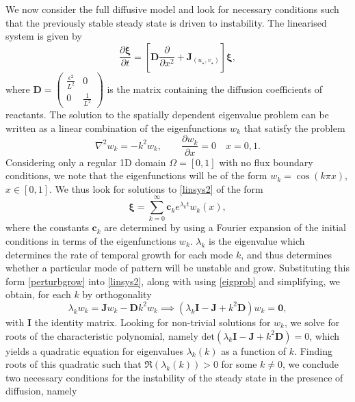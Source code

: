 We now consider the full diffusive model and look for necessary conditions such that the previously stable steady state is driven to instability. The linearised system is given by
\begin{equation}\label{linsys2}
    \frac{\partial \pmb{\xi}}{\partial t}=\left[\textbf{D}\frac{\partial}{\partial x^2}+\textbf{J}_{(u_\star,v_\star)} \right]\pmb{\xi},
\end{equation}
where $\textbf{D}=\begin{pmatrix}\frac{\epsilon^2}{L^2}&0\\0&\frac{1}{L^2}\end{pmatrix}$ is the matrix containing the diffusion coefficients of reactants. The solution to the spatially dependent eigenvalue problem can be written as a linear combination of the eigenfunctions $w_k$ that satisfy the problem
\begin{equation}\label{eigprob}
\nabla^2w_k=-k^2w_k,\quad \quad \frac{\partial w_k}{\partial x}=0\quad x=0, 1.
\end{equation}
Considering only a regular 1D domain $\Omega=[0,1]$ with no flux boundary conditions, we note that the eigenfunctions will be of the form $w_k=\cos(k\pi x)$, $x\in[0,1]$. We thus look for solutions to \eqref{linsys2} of the form
\begin{equation}\label{perturbgrow}
    \pmb{\xi}=\sum_{k=0}^{\infty} \textbf{c}_ke^{\lambda_k t}w_k(x),
\end{equation}
where the constants $\textbf{c}_k$ are determined by using a Fourier expansion of the initial conditions in terms of the eigenfunctions $w_k$. $\lambda_k$ is the eigenvalue which determines the rate of temporal growth for each mode $k$, and thus determines whether a particular mode of pattern will be unstable and grow. Substituting this form \eqref{perturbgrow} into \eqref{linsys2}, along with using \eqref{eigprob} and simplifying, we obtain, for each $k$ by orthogonality
$$
\lambda_k w_k=\textbf{J}w_k-\textbf{D}k^2w_k \implies (\lambda_k \textbf{I}-\textbf{J}+k^2\textbf{D})w_k=\textbf{0},
$$
with $\textbf{I}$ the identity matrix. Looking for non-trivial solutions for $w_k$, we solve for roots of the characteristic polynomial, namely $\text{det}(\lambda_k \textbf{I}-\textbf{J}+k^2\textbf{D})=0$, which yields a quadratic equation for eigenvalues $\lambda_k(k)$ as a function of $k$. Finding roots of this quadratic such that $\Re(\lambda_k(k))>0$ for some $k\neq0$, we conclude \cite{murray} two necessary conditions for the instability of the steady state in the presence of diffusion, namely
